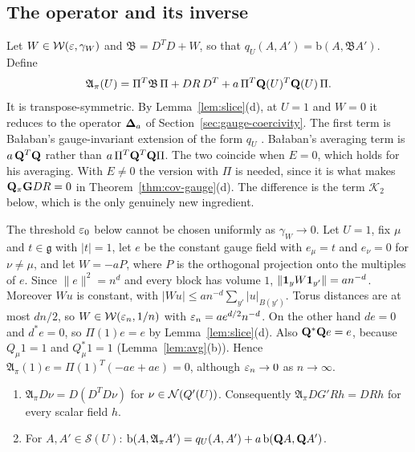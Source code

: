 \subsection{The operator and its inverse}\label{ss:15.2}

Let $W\in\mathcal W(\varepsilon,\gamma_W)$ and $\mathfrak B=D^TD+W$, so that $q_U(A,A')=\mathrm b(A,\mathfrak BA')$. Define
\[
\mathfrak A_\pi(U)=\Pi^T\mathfrak B\,\Pi+DR\,D^T+a\,\Pi^T\mathbf Q(U)^T\mathbf Q(U)\,\Pi .
\]
It is transpose-symmetric. By Lemma~\ref{lem:slice}(d), at $U=1$ and $W=0$ it reduces to the operator $\boldsymbol{\Delta}_a$ of Section~\ref{sec:gauge-coercivity}. The first term is Ba\l aban's gauge-invariant extension of the form $q_U$ \cite[(3.118)--(3.120), (3.128)]{BalBackground}. Ba\l aban's averaging term is $a\,\mathbf Q^T\mathbf Q$ rather than $a\,\Pi^T\mathbf Q^T\mathbf Q\Pi$. The two coincide when $E=0$, which holds for his averaging. With $E\ne0$ the version with $\Pi$ is needed, since it is what makes $\mathbf Q_\pi\mathbf G DR=0$ in Theorem~\ref{thm:cov-gauge}(d). The difference is the term $\mathcal K_2$ below, which is the only genuinely new ingredient.

\begin{remark}\label{rem:gammaW}
The threshold $\varepsilon_0$ below cannot be chosen uniformly as $\gamma_W\to0$. Let $U=1$, fix $\mu$ and $t\in\mathfrak g$ with $|t|=1$, let $e$ be the constant gauge field with $e_\mu=t$ and $e_\nu=0$ for $\nu\ne\mu$, and let $W=-aP$, where $P$ is the orthogonal projection onto the multiples of $e$. Since $\|e\|^2=n^d$ and every block has volume $1$, $\|\mathbf 1_yW\mathbf 1_{y'}\|=an^{-d}$. Moreover $Wu$ is constant, with $|Wu|\le an^{-d}\sum_{y'}|u|_{B(y')}$. Torus distances are at most $dn/2$, so $W\in\mathcal W(\varepsilon_n,1/n)$ with $\varepsilon_n=ae^{d/2}n^{-d}$. On the other hand $de=0$ and $d^*e=0$, so $\Pi(1)e=e$ by Lemma~\ref{lem:slice}(d). Also $\mathbf Q^*\mathbf Q e=e$, because $Q_\mu1=1$ and $Q_\mu^*1=1$ (Lemma~\ref{lem:avg}(b)). Hence $\mathfrak A_\pi(1)e=\Pi(1)^T(-ae+ae)=0$, although $\varepsilon_n\to0$ as $n\to\infty$.
\end{remark}

\begin{lemma}[Identities]\label{lem:Api-identities}
\begin{enumerate}[label=(\alph*)]
\item $\mathfrak A_\pi D\nu=D(D^TD\nu)$ for $\nu\in\mathcal N(Q'(U))$. Consequently $\mathfrak A_\pi DG'Rh=DRh$ for every scalar field $h$.
\item For $A,A'\in\mathcal S(U)$: $\mathrm b(A,\mathfrak A_\pi A')=q_U(A,A')+a\,\mathrm b(\mathbf Q A,\mathbf Q A')$.
\end{enumerate}
\end{lemma}

